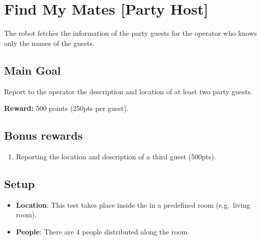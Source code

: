 \section{Find My Mates [Party Host]}
\label{test:find-my-mates}
The robot fetches the information of the party guests for the operator who knows only the names of the guests.


\subsection*{Main Goal}
Report to the operator the description and location of at least two party guests.

\noindent\textbf{Reward:} 500 points (250pts per guest).

\subsection*{Bonus rewards}
\begin{enumerate}[nosep]
	\item Reporting the location and description of a third guest (500pts).
\end{enumerate}


\subsection*{Setup}
\begin{itemize}
	\item \textbf{Location}: This test takes place inside the \Arena{} in a predefined room (e.g.~living room).

	\item \textbf{People}: There are 4 people distributed along the room.
\end{itemize}

